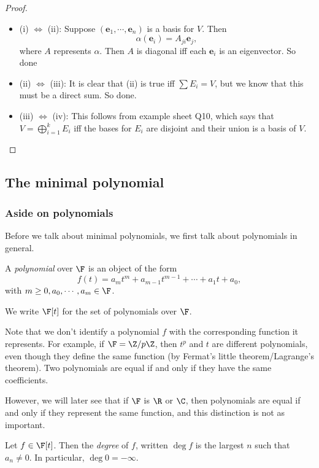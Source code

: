\documentclass[a4paper]{article}
\begin{document}
\begin{proof}\leavevmode
  \begin{itemize}
    \item (i) $\Leftrightarrow$ (ii): Suppose $(\mathbf{e}_1, \cdots, \mathbf{e}_n)$ is a basis for $V$. Then
      \[
        \alpha(\mathbf{e}_i) = A_{ji} \mathbf{e}_j,
      \]
      where $A$ represents $\alpha$. Then $A$ is diagonal iff each $\mathbf{e}_i$ is an eigenvector. So done
    \item (ii) $\Leftrightarrow$ (iii): It is clear that (ii) is true iff $\sum E_i = V$, but we know that this must be a direct sum. So done.
    \item (iii) $\Leftrightarrow$ (iv): This follows from example sheet Q10, which says that $V = \bigoplus_{i = 1}^k E_i$ iff the bases for $E_i$ are disjoint and their union is a basis of $V$.
  \end{itemize}
\end{proof}
\subsection{The minimal polynomial}
\subsubsection{Aside on polynomials}
Before we talk about minimal polynomials, we first talk about polynomials in general.

\begin{defi}[Polynomial]
  A \emph{polynomial} over $\F$ is an object of the form
  \[
    f(t) = a_m t^m + a_{m - 1}t^{m - 1} + \cdots + a_1 t + a_0,
  \]
  with $m \geq 0, a_0, \cdots, a_m \in \F$.

  We write $\F[t]$ for the set of polynomials over $\F$.
\end{defi}
Note that we don't identify a polynomial $f$ with the corresponding function it represents. For example, if $\F = \Z/p\Z$, then $t^p$ and $t$ are different polynomials, even though they define the same function (by Fermat's little theorem/Lagrange's theorem). Two polynomials are equal if and only if they have the same coefficients.

However, we will later see that if $\F$ is $\R$ or $\C$, then polynomials are equal if and only if they represent the same function, and this distinction is not as important.

\begin{defi}[Degree]
  Let $f \in \F[t]$. Then the \emph{degree} of $f$, written $\deg f$ is the largest $n$ such that $a_n \not= 0$. In particular, $\deg 0 = -\infty$.
\end{defi}
\end{document}
